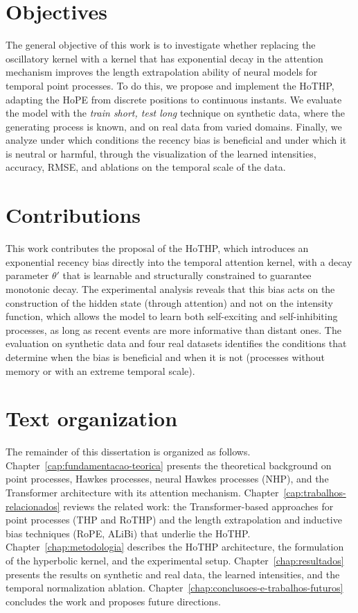 \section{Objectives}

The general objective of this work is to investigate whether replacing the oscillatory kernel with a kernel that has exponential decay in the attention mechanism improves the length extrapolation ability of neural models for temporal point processes. To do this, we propose and implement the HoTHP, adapting the HoPE \cite{dai_hope_2025} from discrete positions to continuous instants. We evaluate the model with the \textit{train short, test long} technique on synthetic data, where the generating process is known, and on real data from varied domains. Finally, we analyze under which conditions the recency bias is beneficial and under which it is neutral or harmful, through the visualization of the learned intensities, accuracy, \gls{RMSE}, and ablations on the temporal scale of the data.

\section{Contributions}

This work contributes the proposal of the HoTHP, which introduces an exponential recency bias directly into the temporal attention kernel, with a decay parameter $\theta'$ that is learnable and structurally constrained to guarantee monotonic decay. The experimental analysis reveals that this bias acts on the construction of the hidden state (through attention) and not on the intensity function, which allows the model to learn both self-exciting and self-inhibiting processes, as long as recent events are more informative than distant ones. The evaluation on synthetic data and four real datasets identifies the conditions that determine when the bias is beneficial and when it is not (processes without memory or with an extreme temporal scale).

\section{Text organization}

The remainder of this dissertation is organized as follows. Chapter~\ref{cap:fundamentacao-teorica} presents the theoretical background on point processes, Hawkes processes, neural Hawkes processes (NHP), and the Transformer architecture with its attention mechanism. Chapter~\ref{cap:trabalhos-relacionados} reviews the related work: the Transformer-based approaches for point processes (THP and RoTHP) and the length extrapolation and inductive bias techniques (RoPE, ALiBi) that underlie the HoTHP. Chapter~\ref{chap:metodologia} describes the HoTHP architecture, the formulation of the hyperbolic kernel, and the experimental setup. Chapter~\ref{chap:resultados} presents the results on synthetic and real data, the learned intensities, and the temporal normalization ablation. Chapter~\ref{chap:conclusoes-e-trabalhos-futuros} concludes the work and proposes future directions.
